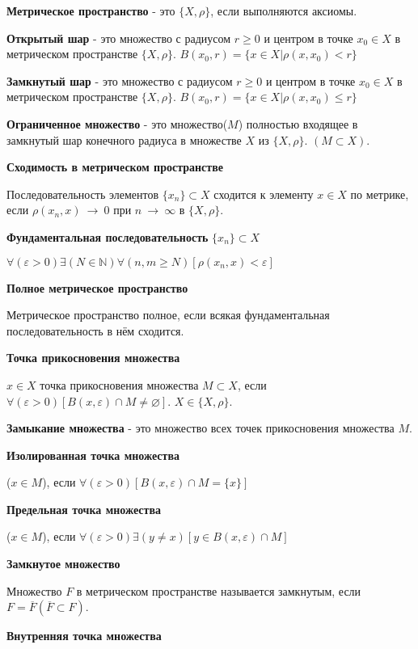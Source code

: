 \textbf{Метрическое пространство} - это $\{X, \rho\}$, если выполняются аксиомы.

\textbf{Открытый шар} - это множество с радиусом $r\geqslant 0$ и центром в точке $x_0\in X$ в метрическом пространстве  $\{X, \rho\}$.
$B(x_0, r)=\{x \in X|\rho(x, x_0)<r \}$

\textbf{Замкнутый шар} - это множество с радиусом $r\geqslant 0$ и центром в точке $x_0\in X$ в метрическом пространстве  $\{X, \rho\}$.
$B(x_0, r)=\{x \in X|\rho(x, x_0)\leqslant r \}$

\textbf{Ограниченное множество} - это множество($M$) полностью входящее в замкнутый шар конечного радиуса в множестве $X$ из $\{X, \rho\}$.
$(M \subset  X) $.

\textbf{Сходимость в метрическом пространстве}

Последовательность элементов $\{x_n \} \subset X$
сходится к элементу $x \in X$ по метрике, 
если $\rho(x_n, x)~\longrightarrow~0$ при $n~\longrightarrow~\infty$ в $\{X, \rho\}$.

\textbf{Фундаментальная последовательность} $\{x_n\}\subset X$

$\forall(\varepsilon >0)\exists(N \in \mathbb{N})\forall(n, m\geqslant N)[\rho(x_n, x)<\varepsilon]$

\textbf{Полное метрическое пространство}

Метрическое пространство полное, если всякая фундаментальная последовательность в нём сходится.

\textbf{Точка прикосновения множества}

$x \in X$ точка прикосновения множества $M \subset X$, если $ \forall(\varepsilon>0)[B(x, \varepsilon)\cap M\neq \varnothing ]$. $X \in \{X, \rho\}$.

\textbf{Замыкание множества} - это множество всех точек прикосновения множества $M$.

\textbf{Изолированная точка множества}

($x \in M$), если $\forall(\varepsilon >0)[B(x, \varepsilon)\cap M = \{x\} ]$

\textbf{Предельная точка множества}

($x \in M$), если $ \forall(\varepsilon >0)\exists(y\neq x)[y \in B(x, \varepsilon)\cap M]$

\textbf{Замкнутое множество}

Множество $F$ в метрическом пространстве называется замкнутым, если $F=\overline{F}(\overline{F}\subset F)$.

\textbf{Внутренняя точка множества}

